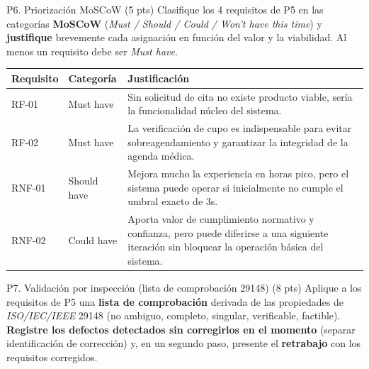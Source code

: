\documentclass[11pt,a4paper,oneside]{article}
\begin{document}
	\vspace{10pt}
	
	\begin{tarea}{P6. Priorizaci\'on MoSCoW \hfill (5 pts)}
		Clasifique los 4 requisitos de P5 en las categor\'ias \textbf{MoSCoW} (\textit{Must / Should / Could / Won't have this time}) y \textbf{justifique} brevemente cada asignaci\'on en funci\'on del valor y la viabilidad. Al menos un requisito debe ser \textit{Must have}.
	\end{tarea}
	
	\vspace{10pt}
	
	\begin{center}\small
		\begin{tabularx}{\linewidth}{|L{1.6cm}|L{2.2cm}|X|}
			\hline
			\textbf{Requisito} & \textbf{Categor\'ia} & \textbf{Justificaci\'on}\\
			\hline
			RF-01 & Must have & Sin solicitud de cita no existe producto viable, ser\'ia la funcionalidad n\'ucleo del sistema.\\
			\hline
			RF-02 & Must have & La verificaci\'on de cupo es indispensable para evitar sobreagendamiento y garantizar la integridad de la agenda m\'edica.\\
			\hline
			RNF-01 & Should have & Mejora mucho la experiencia en horas pico, pero el sistema puede operar si inicialmente no cumple el umbral exacto de 3s.\\
			\hline
			RNF-02 & Could have & Aporta valor de cumplimiento normativo y confianza, pero puede diferirse a una siguiente iteraci\'on sin bloquear la operaci\'on b\'asica del sistema.\\
			\hline
		\end{tabularx}
	\end{center}
	
	\vspace{10pt}
	
	\begin{tarea}{P7. Validaci\'on por inspecci\'on (lista de comprobaci\'on 29148) \hfill (8 pts)}
		Aplique a los requisitos de P5 una \textbf{lista de comprobaci\'on} derivada de las propiedades de \textit{ISO/IEC/IEEE} 29148 (no ambiguo, completo, singular, verificable, factible). \textbf{Registre los defectos detectados sin corregirlos en el momento} (separar identificaci\'on de correcci\'on) y, en un segundo paso, presente el \textbf{retrabajo} con los requisitos corregidos.
	\end{tarea}
	
\end{document}
